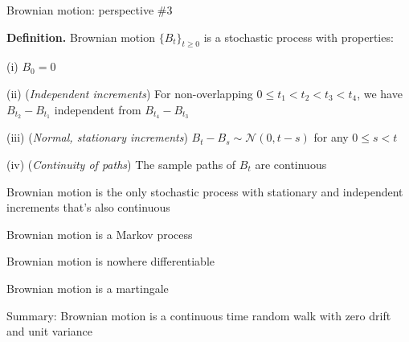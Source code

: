 \documentclass[11pt, aspectratio=169]{beamer}
\newenvironment{witemize}{\itemize\addtolength{\itemsep}{10pt}}{\enditemize}
\begin{document}
\begin{frame}{Brownian motion: perspective \#3}

\vspace{4mm}
\textbf{Definition.} Brownian motion $\{B_t\}_{t\geq 0}$ is a stochastic process with properties:
\begin{witemize}
\item [(i)] $B_0 = 0$

\vspace{-3mm}
\item [(ii)] (\textit{Independent increments}) For non-overlapping $0 \leq t_1 < t_2 < t_3 < t_4$, we have $B_{t_2} - B_{t_1}$ independent from $B_{t_4} - B_{t_3}$

\vspace{-3mm}
\item [(iii)] (\textit{Normal, stationary increments}) $B_t - B_s \sim \mathcal N(0, t-s)$ for any $0 \leq s < t$

\vspace{-3mm}
\item [(iv)]  (\textit{Continuity of paths}) The sample paths of $B_t$ are continuous
\end{witemize}

\end{frame}


\begin{frame}{}
\begin{witemize}
\item Brownian motion is the only stochastic process with stationary and independent increments that's also continuous

\item Brownian motion is a Markov process

\item Brownian motion is nowhere differentiable

\item Brownian motion is a martingale

\item Summary: Brownian motion is a continuous time random walk with zero drift and unit variance 	
\end{witemize}
\end{frame}
\end{document}
